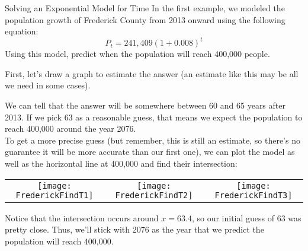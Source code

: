 \begin{example}[https://www.youtube.com/watch?v=7uKfX9Uap0w&list=PLfmpjsIzhztutjEb8Pg5OBOlI1p80yVoy&index=11]{Solving an Exponential Model for Time}
In the first example, we modeled the population growth of Frederick County from 2013 onward using the following equation:
\[P_t = 241,409(1+0.008)^t\]
Using this model, predict when the population will reach 400,000 people.

\sol
First, let's draw a graph to estimate the answer (an estimate like this may be all we need in some cases).
\begin{center}
\end{center}

We can tell that the answer will be somewhere between 60 and 65 years after 2013.  If we pick 63 as a reasonable guess, that means we expect the population to reach 400,000 around the year 2076.\\

To get a more precise guess (but remember, this is still an estimate, so there's no guarantee it will be more accurate than our first one), we can plot the model as well as the horizontal line at 400,000 and find their intersection:
\begin{center}
\begin{tabular}{c c c}
\texttt{[image: FrederickFindT1]}
& \texttt{[image: FrederickFindT2]}
& \texttt{[image: FrederickFindT3]}
\end{tabular}
\end{center}

Notice that the intersection occurs around $x=63.4$, so our initial guess of 63 was pretty close.  Thus, we'll stick with 2076 as the year that we predict the population will reach 400,000.
\end{example}

